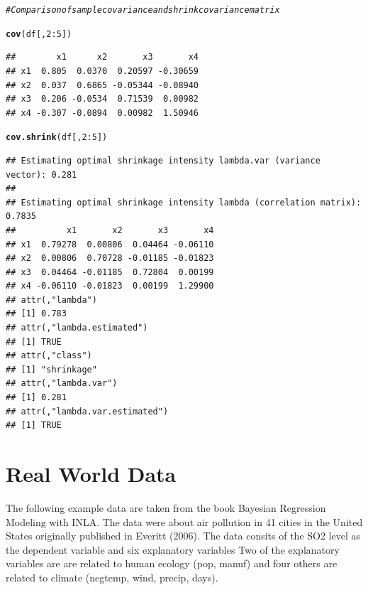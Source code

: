 \documentclass[11pt,a4paper,twoside]{book}\usepackage[]{graphicx}\usepackage[]{color}
\makeatletter
\newcommand{\hlnum}[1]{\textcolor[rgb]{0.686,0.059,0.569}{#1}}%
\newcommand{\hlcom}[1]{\textcolor[rgb]{0.678,0.584,0.686}{\textit{#1}}}%
\newcommand{\hlopt}[1]{\textcolor[rgb]{0,0,0}{#1}}%
\newcommand{\hlstd}[1]{\textcolor[rgb]{0.345,0.345,0.345}{#1}}%
\newcommand{\hlkwd}[1]{\textcolor[rgb]{0.737,0.353,0.396}{\textbf{#1}}}%
\newenvironment{kframe}{%
 \def\at@end@of@kframe{}%
 \ifinner\ifhmode%
  \def\at@end@of@kframe{\end{minipage}}%
  \begin{minipage}{\columnwidth}%
 \fi\fi%
 \def\FrameCommand##1{\hskip\@totalleftmargin \hskip-\fboxsep
 \colorbox{shadecolor}{##1}\hskip-\fboxsep
     \hskip-\linewidth \hskip-\@totalleftmargin \hskip\columnwidth}%
 \MakeFramed {\advance\hsize-\width
   \@totalleftmargin\z@ \linewidth\hsize
   \@setminipage}}%
 {\par\unskip\endMakeFramed%
 \at@end@of@kframe}
\newenvironment{knitrout}{}{} %
\makeatother
\begin{document}
\begin{knitrout}
\color{fgcolor}\begin{kframe}
\begin{alltt}
\hlcom{#Comparison of sample covariance and shrink covariance matrix}

\hlkwd{cov}\hlstd{(df[,}\hlnum{2}\hlopt{:}\hlnum{5}\hlstd{])}
\end{alltt}
\begin{verbatim}
##        x1      x2       x3       x4
## x1  0.805  0.0370  0.20597 -0.30659
## x2  0.037  0.6865 -0.05344 -0.08940
## x3  0.206 -0.0534  0.71539  0.00982
## x4 -0.307 -0.0894  0.00982  1.50946
\end{verbatim}
\begin{alltt}
\hlkwd{cov.shrink}\hlstd{(df[,}\hlnum{2}\hlopt{:}\hlnum{5}\hlstd{])}
\end{alltt}
\begin{verbatim}
## Estimating optimal shrinkage intensity lambda.var (variance vector): 0.281 
## 
## Estimating optimal shrinkage intensity lambda (correlation matrix): 0.7835
##          x1       x2       x3       x4
## x1  0.79278  0.00806  0.04464 -0.06110
## x2  0.00806  0.70728 -0.01185 -0.01823
## x3  0.04464 -0.01185  0.72804  0.00199
## x4 -0.06110 -0.01823  0.00199  1.29900
## attr(,"lambda")
## [1] 0.783
## attr(,"lambda.estimated")
## [1] TRUE
## attr(,"class")
## [1] "shrinkage"
## attr(,"lambda.var")
## [1] 0.281
## attr(,"lambda.var.estimated")
## [1] TRUE
\end{verbatim}
\end{kframe}
\end{knitrout}

\section{Real World Data}


The following example data are taken from the book Bayesian Regression Modeling with INLA. The data were about air pollution in 41 cities in the United States originally published in Everitt (2006). The data consits of the SO2 level as the dependent variable and six explanatory variables 
Two of the explanatory variables are are related to human ecology (pop, manuf) and four others are related to climate (negtemp, wind, precip, days).
\end{document}
